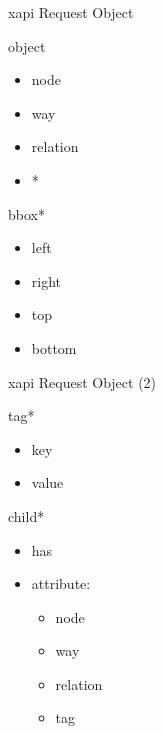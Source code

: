 \documentclass{beamer}
\begin{document}
\begin{frame}{xapi Request Object}

    \begin{block}{object}
        \begin{itemize}
            \item node
            \item way
            \item relation
            \item *
        \end{itemize}
    \end{block}

    \begin{block}{bbox*}
        \begin{itemize}
            \item left
            \item right
            \item top
            \item bottom
        \end{itemize}
    \end{block}

\end{frame}

\begin{frame}{xapi Request Object (2)}
    \begin{block}{tag*}
        \begin{itemize}
            \item key
            \item value
        \end{itemize}
    \end{block}

     \begin{block}{child*}
        \begin{itemize}
            \item has
            \item attribute: 
                \begin{itemize}
                    \item node
                    \item way
                    \item relation
                    \item tag
                \end{itemize}
        \end{itemize}
    \end{block}


\end{frame}
\end{document}
